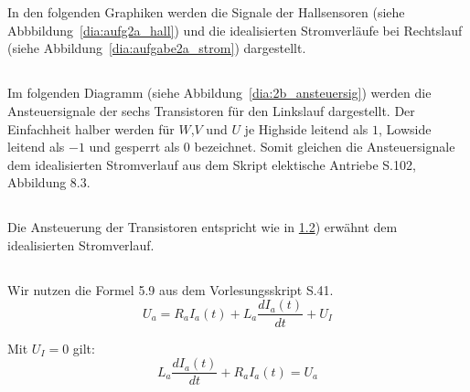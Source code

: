 %
%
%
%
\chapter{}\label{ex:aufg2}
%
%
\section{}\label{sec:aufg2a}
%
In den folgenden Graphiken werden die Signale der Hallsensoren (siehe Abbbildung~\ref{dia:aufg2a_hall}) und die idealisierten Stromverläufe bei Rechtslauf (siehe Abbildung~\ref{dia:aufgabe2a_strom}) dargestellt.


\newpage
%
%
%
\section{}\label{sec:aufg2b}
%
Im folgenden Diagramm (siehe Abbildung~\ref{dia:2b_ansteuersig}) werden die Ansteuersignale der sechs Transistoren für den Linkslauf dargestellt. Der Einfachheit halber werden für $W$,$V$ und $U$ je Highside leitend als $1$, Lowside leitend als $-1$ und gesperrt als $0$ bezeichnet. Somit gleichen die Ansteuersignale dem idealisierten Stromverlauf aus dem Skript elektische Antriebe S.102, Abbildung 8.3.

%
\section{}\label{sec:aufg2c}
%
Die Ansteuerung der Transistoren entspricht wie in \ref{sec:aufg2b}) erwähnt  dem idealisierten Stromverlauf.

%
\newpage
\section{}\label{sec:aufg2d}
%
Wir nutzen die Formel 5.9 aus dem Vorlesungsskript S.41.
\begin{equation}
	U_a = R_a I_a(t) + L_a \frac{dI_a(t)}{dt} + U_I
	\label{for:formel1}
\end{equation}

Mit $U_I = 0$ gilt:
\begin{equation}
    L_a\frac{dI_a(t)}{dt} + R_a I_a(t) = U_a
	\label{for:formel2}
\end{equation}

